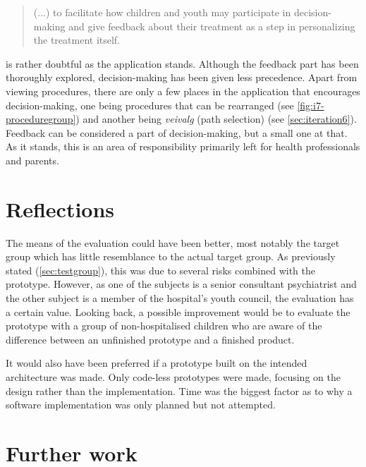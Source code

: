 \begin{quote}
    (...) to facilitate how children and youth may participate in decision-making and give feedback about their treatment as a step in personalizing the treatment itself.
\end{quote}

is rather doubtful as the application stands. Although the feedback part has been thoroughly explored, decision-making has been given less precedence. Apart from viewing procedures, there are only a few places in the application that encourages decision-making, one being procedures that can be rearranged (see \autoref{fig:i7-proceduregroup}) and another being \emph{veivalg} (path selection) (see \autoref{sec:iteration6}). Feedback can be considered a part of decision-making, but a small one at that. As it stands, this is an area of responsibility primarily left for health professionals and parents.


\section{Reflections}
\label{sec:reflections}

The means of the evaluation could have been better, most notably the target group which has little resemblance to the actual target group. As previously stated (\autoref{sec:testgroup}), this was due to several risks combined with the prototype. However, as one of the subjects is a senior consultant psychiatrist and the other subject is a member of the hospital's youth council, the evaluation has a certain value. Looking back, a possible improvement would be to evaluate the prototype with a group of non-hospitalised children who are aware of the difference between an unfinished prototype and a finished product.

It would also have been preferred if a prototype built on the intended architecture was made. Only code-less prototypes were made, focusing on the design rather than the implementation. Time was the biggest factor as to why a software implementation was only planned but not attempted.

\section{Further work}
\label{sec:furtherwork}

